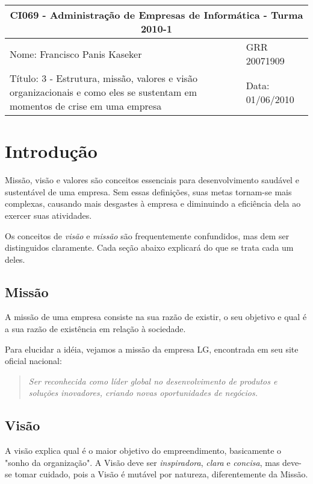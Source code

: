 \documentclass[12pt,a4paper]{article}
\begin{document}
\setlength{\parskip}{2ex}

\begin{tabular}[l]{ | p{10cm} | l | }
  \hline
  \multicolumn{2}{|c|}{CI069 - Administração de Empresas de Informática - Turma 2010-1} \\
  \hline
  Nome: Francisco Panis Kaseker & 
  GRR 20071909 \\
  \hline
  Título: 3 - Estrutura, missão, valores e visão organizacionais e como eles se sustentam em momentos de crise em uma empresa &
  Data: 01/06/2010 \\
  \hline
\end{tabular}


\vspace{1cm}

\section{Introdução}

Missão, visão e valores são conceitos essenciais para desenvolvimento saudável e sustentável de uma empresa. Sem essas definições, suas metas tornam-se mais complexas, causando mais desgastes à empresa e diminuindo a eficiência dela ao exercer suas atividades.

Os conceitos de \textit{visão} e \textit{missão} são frequentemente confundidos, mas dem ser distinguidos claramente. Cada seção abaixo explicará do que se trata cada um deles.

\subsection{Missão}

A missão de uma empresa consiste na sua razão de existir, o seu objetivo e qual é a sua razão de existência em relação à sociedade.

Para elucidar a idéia, vejamos a missão da empresa LG, encontrada em seu site oficial nacional:

\begin{quote}
\textit{Ser reconhecida como líder global no desenvolvimento de produtos e soluções inovadores, criando novas oportunidades de negócios.}
\end{quote}

\subsection{Visão}

A visão explica qual é o maior objetivo do empreendimento, basicamente o "sonho da organização". A Visão deve ser \textit{inspiradora}, \textit{clara} e \textit{concisa}, mas deve-se tomar cuidado, pois a Visão é mutável por natureza, diferentemente da Missão.
\end{document}
